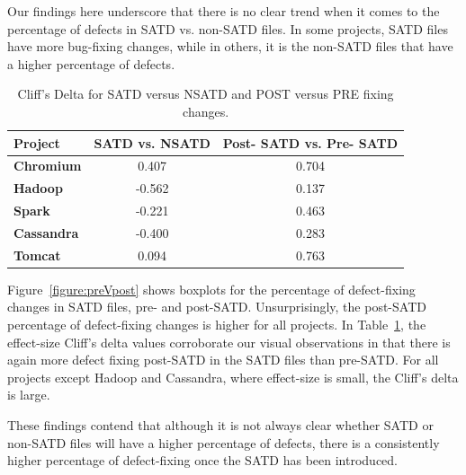 Our findings here underscore that there is no clear trend when it comes to the percentage of defects in SATD vs. non-SATD files. In some projects, SATD files have more bug-fixing changes, while in others, it is the non-SATD files that have a higher percentage of defects.

\begin{table}[tb]
	\setlength{\tabcolsep}{.7\tabcolsep}
	\centering
	\caption{Cliff's Delta for SATD versus NSATD and POST versus PRE fixing changes.}
	\begin{tabular}{l|c|c}
		\hline
		\textbf{Project}   & {\bf SATD vs. NSATD} & {\bf Post- SATD vs. Pre- SATD} \\ \hline
		\textbf{Chromium}  & 0.407          & 0.704        \\ \hline
		\textbf{Hadoop}    & -0.562         & 0.137        \\ \hline
		\textbf{Spark}     & -0.221         & 0.463        \\ \hline
		\textbf{Cassandra} & -0.400         & 0.283        \\ \hline
		\textbf{Tomcat}    & 0.094          & 0.763        \\ \hline
	\end{tabular}
	\label{table:cliff_deltas_RQ1}
\end{table}

 Figure~\ref{figure:preVpost} shows boxplots for the percentage of defect-fixing changes in SATD files, pre- and post-SATD. Unsurprisingly, the post-SATD percentage of defect-fixing changes is higher for all projects. In Table~\ref{table:cliff_deltas_RQ1}, the effect-size Cliff's delta values corroborate our visual observations in that there is again more defect fixing post-SATD in the SATD files than pre-SATD. For all projects except Hadoop and Cassandra, where effect-size is small, the Cliff's delta is large.


These findings contend that although it is not always clear whether SATD or non-SATD files will have a higher percentage of defects, there is a consistently higher percentage of defect-fixing once the SATD has been introduced.



